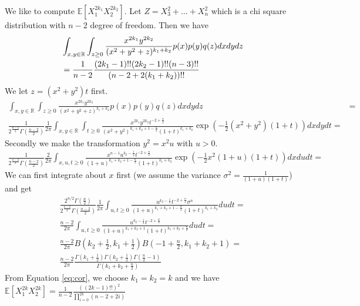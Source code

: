 \documentclass{article}
\def\E{\mathbb{E}}
\begin{document}
We like to compute $\E[X_1^{2k_1} X_2^{2k_2}]$. Let $ Z = X_3^2 + \dots + X_n^2$ which is a chi square distribution with $n-2$ degree of freedom.
Then we have
\begin{align}\label{eq:cor}
&\int_{x,y\in \mathbb{R}}\int_{z\geq 0} \frac{x^{2k_1} y^{2k_2}}{(x^2+y^2+z)^{k_1 + k_2}} p(x)p(y)q(z) dxdydz \notag\\
&=\frac{1}{n-2}\frac{(2k_1 -1)!!(2k_2-1)!! (n-3)!!}{(n-2 + 2(k_1 + k_2))!!}
\end{align}
We let $z=(x^2+y^2)t$ first.
\begin{align*}
\int_{x,y\in \mathbb{R}}\int_{z\geq 0} \frac{x^{2k_1} y^{2k_2}}{(x^2+y^2+z)^{k_1 + k_2}} p(x)p(y)q(z) dxdydz & =\\
\frac{1}{2^{\frac{n-2}{2}}\Gamma(\frac{n-2}{2})}\frac{1}{2\pi} \int_{x,y\in \mathbb{R}}\int_{t\geq 0}\frac{x^{2k_1} y^{2k_2}t^{-2+\frac{n}{2}}}{(x^2+y^2)^{k_1 + k_2+1-\frac{n}{2}}(1+t)^{k_1 + k_2}}\exp(-\frac{1}{2}(x^2+y^2)(1+t))dxdydt =
\end{align*}
Secondly we make the transformation $y^2=x^2u$ with $u>0$.
\begin{align*}
\frac{1}{2^{\frac{n-2}{2}}\Gamma(\frac{n-2}{2})}\frac{2}{2\pi}\int_{x,u,t\geq 0}\frac{x^{n-1} u^{k_2 - \frac{1}{2}}t^{-2+\frac{n}{2}}}{(1+u)^{k_1 + k_2+1-\frac{n}{2}}(1+t)^{k_1 + k_2}}\exp(-\frac{1}{2}x^2(1+u)(1+t))dxdudt =
\end{align*}
We can first integrate about $x$ first (we assume the variance $\sigma^2 = \frac{1}{(1+u)(1+t)}$)
and get
\begin{align*}
\frac{2^{n/2} \Gamma(\frac{n}{2})}{2^{\frac{n-2}{2}}\Gamma(\frac{n-2}{2})}\frac{1}{2\pi}\int_{u,t\geq 0} \frac{u^{k_2 - \frac{1}{2}}t^{-2+\frac{n}{2}}\sigma^n}{(1+u)^{k_1 + k_2+1-\frac{n}{2}}(1+t)^{k_1 + k_2}}dudt = \\
\frac{n-2}{2\pi}\int_{u,t\geq 0} \frac{u^{k_2 - \frac{1}{2}}t^{-2+\frac{n}{2}}}{(1+u)^{k_1 + k_2+1}(1+t)^{k_1 + k_2 + \frac{n}{2}}}dudt = \\
\frac{n-2}{2\pi} B(k_2 + \frac{1}{2}, k_1 + \frac{1}{2}) B(-1+\frac{n}{2}, k_1 + k_2 + 1) =\\
\frac{n-2}{2\pi} \frac{\Gamma(k_1 + \frac{1}{2}) \Gamma(k_2 + \frac{1}{2})\Gamma(\frac{n}{2}-1)}{\Gamma(k_1 + k_2 + \frac{n}{2})}
\end{align*}
From Equation \eqref{eq:cor}, we choose $k_1 = k_2 = k$ and we have
$\E[X_1^{2k}X_2^{2k}]=\frac{1}{n-2}\frac{((2k-1)!!)^2}{\prod_{i=0}^{2k} (n-2 + 2i)}$


\end{document}
